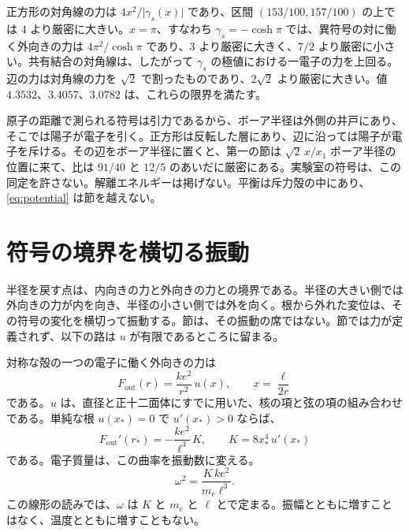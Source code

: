 \documentclass[a4paper]{article}
\begin{document}
正方形の対角線の力は \(4x^{2}/\bigl|\gamma_s(x)\bigr|\) であり、区間 \((153/100,157/100)\) の上では \(4\) より厳密に大きい。\(x=\pi\)、すなわち \(\gamma_s=-\cosh\pi\) では、異符号の対に働く外向きの力は \(4\pi^{2}/\cosh\pi\) であり、\(3\) より厳密に大きく、\(7/2\) より厳密に小さい。共有結合の対角線は、したがって \(\gamma_s\) の極値における一電子の力を上回る。辺の力は対角線の力を \(\sqrt{2}\) で割ったものであり、\(2\sqrt{2}\) より厳密に大きい。値 \(4.3532\)、\(3.4057\)、\(3.0782\) は、これらの限界を満たす。

原子の距離で測られる符号は引力であるから、ボーア半径は外側の井戸にあり、そこでは陽子が電子を引く。正方形は反転した層にあり、辺に沿っては陽子が電子を斥ける。その辺をボーア半径に置くと、第一の節は \(\sqrt{2}\,x/x_1\) ボーア半径の位置に来て、比は \(91/40\) と \(12/5\) のあいだに厳密にある。実験室の符号は、この同定を許さない。解離エネルギーは掲げない。平衡は斥力殻の中にあり、\eqref{eq:potential} は節を越えない。

\section{符号の境界を横切る振動}
\label{sec:heat}

半径を戻す点は、内向きの力と外向きの力との境界である。半径の大きい側では外向きの力が内を向き、半径の小さい側では外を向く。根から外れた変位は、その符号の変化を横切って振動する。節は、その振動の席ではない。節では力が定義されず、以下の路は \(u\) が有限であるところに留まる。

対称な殻の一つの電子に働く外向きの力は
\begin{equation}
\label{eq:Fout}
F_{\mathrm{out}}(r)=\frac{k e^{2}}{r^{2}}\,u(x),
\qquad
x=\frac{\ell}{2r}
\end{equation}
である。\(u\) は、直径と正十二面体にすでに用いた、核の項と弦の項の組み合わせである。単純な根 \(u(x_*)=0\) で \(u'(x_*)>0\) ならば、
\begin{equation}
\label{eq:curv}
F_{\mathrm{out}}'(r_*)=-\frac{k e^{2}}{\ell^{3}}\,K,
\qquad
K=8x_*^4\,u'(x_*)
\end{equation}
である。電子質量は、この曲率を振動数に変える。
\begin{equation}
\label{eq:omega}
\omega^{2}=\frac{K\,k e^{2}}{m_e\ell^{3}}.
\end{equation}
この線形の読みでは、\(\omega\) は \(K\) と \(m_e\) と \(\ell\) とで定まる。振幅とともに増すことはなく、温度とともに増すこともない。
\end{document}
